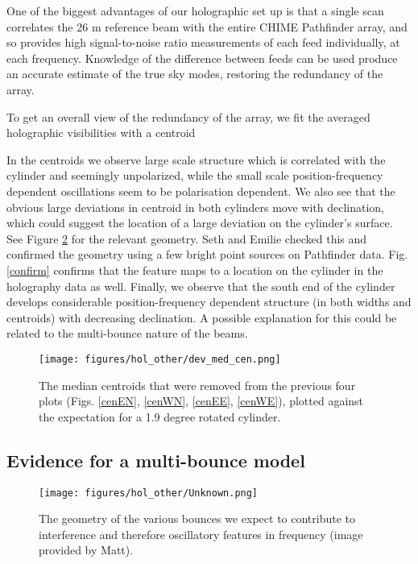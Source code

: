 One of the biggest advantages of our holographic set up is that a single scan correlates the 26 m reference beam with the entire CHIME Pathfinder array, and so provides high signal-to-noise ratio measurements of each feed individually, at each frequency. Knowledge of the difference between feeds can be used produce an accurate estimate of the true sky modes, restoring the redundancy of the array. 

To get an overall view of the redundancy of the array, we fit the averaged holographic visibilities with a centroid 

In the centroids we observe large scale structure which is correlated with the cylinder and seemingly unpolarized, while the small scale position-frequency dependent oscillations seem to be polarisation dependent. We also see that the obvious large deviations in centroid in both cylinders move with declination, which could suggest the location of a large deviation on the cylinder's surface. See Figure \ref{unknown} for the relevant geometry. Seth and Emilie checked this and confirmed the geometry using a few bright point sources on Pathfinder data. Fig. \ref{confirm} confirms that the feature maps to a location on the cylinder in the holography data as well. Finally, we observe that the south end of the cylinder develops considerable position-frequency dependent structure (in both widths and centroids) with decreasing declination. A possible explanation for this could be related to the multi-bounce nature of the beams.


\begin{figure}[h!]
\begin{center}
\texttt{[image: figures/hol\_other/dev\_med\_cen.png]}
\end{center}
\caption{The median centroids that were removed from the previous four plots (Figs. \ref{cenEN}, \ref{cenWN}, \ref{cenEE}, \ref{cenWE}), plotted against the expectation for a 1.9 degree rotated cylinder.}
\label{devmedcen}
\end{figure}


\subsection{Evidence for a multi-bounce model}


\begin{figure}[h!]
\begin{center}
\texttt{[image: figures/hol\_other/Unknown.png]}
\end{center}
\caption{The geometry of the various bounces we expect to contribute to interference and therefore oscillatory features in frequency (image provided by Matt).}
\label{unknown}
\end{figure}

